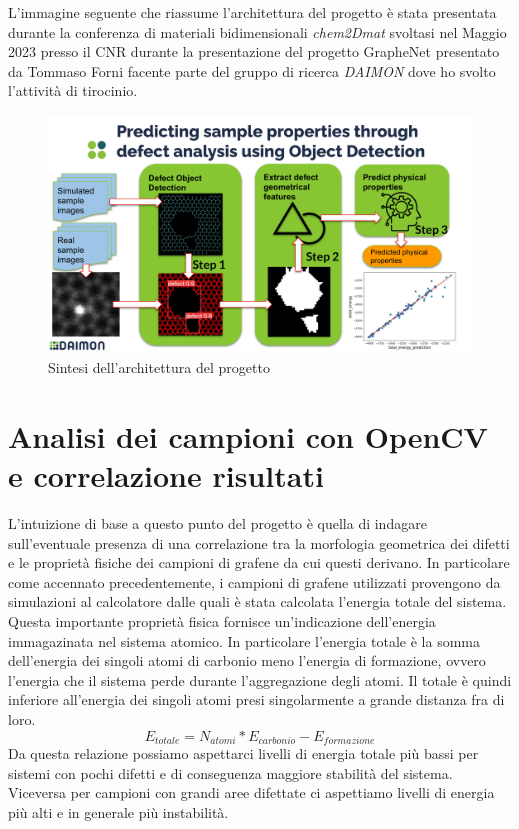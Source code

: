 \documentclass[12pt,a4paper,openright,twoside]{report}
\begin{document}
L'immagine seguente che riassume l'architettura del progetto è stata presentata durante la conferenza di materiali bidimensionali \emph{chem2Dmat} svoltasi nel Maggio 2023 presso il CNR durante la presentazione del progetto GrapheNet \cite{Forni} presentato da Tommaso Forni facente parte del gruppo di ricerca \emph{DAIMON} dove ho svolto l'attività di tirocinio.
\begin{center}
\begin{figure}[h]
\centering
\includegraphics[width=450px,keepaspectratio]{Slide gabriele-1.png}
\caption{Sintesi dell'architettura del progetto}
\end{figure}    
\end{center}

\section{Analisi dei campioni con OpenCV e correlazione risultati}
L'intuizione di base a questo punto del progetto è quella di indagare sull'eventuale presenza di una correlazione tra la morfologia geometrica dei difetti e le proprietà fisiche dei campioni di grafene da cui questi derivano. 
In particolare come accennato precedentemente, i campioni di grafene utilizzati provengono da simulazioni al calcolatore dalle quali è stata calcolata l'energia totale del sistema. Questa importante proprietà fisica fornisce un'indicazione dell'energia immagazinata nel sistema atomico. In particolare l'energia totale è la somma dell'energia dei singoli atomi di carbonio meno l'energia di formazione, ovvero l'energia che il sistema perde durante l'aggregazione degli atomi. Il totale è quindi inferiore all'energia dei singoli atomi presi singolarmente a grande distanza fra di loro. 
\begin{equation}
    E_{totale} = N_{atomi} * E_{carbonio} - E_{formazione} 
\end{equation}
Da questa relazione possiamo aspettarci livelli di energia totale più bassi per sistemi con pochi difetti e di conseguenza maggiore stabilità del sistema. Viceversa per campioni con grandi aree difettate ci aspettiamo livelli di energia più alti e in generale più instabilità.
\end{document}
